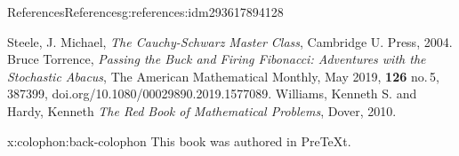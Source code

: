 \documentclass[twoside,10pt,]{book}
\newcommand{\xreffont}{\relax}
\numberwithin{equation}{section}
\begin{document}
\begin{references-chapter-numberless}{References}{}{References}{}{}{g:references:idm293617894128}
\begin{referencelist}
\label{x:biblio:biblio-steele-2004}{}\hypertarget{x:biblio:biblio-steele-2004}{}Steele, J. Michael, \textit{The Cauchy-Schwarz Master Class}, Cambridge U. Press, 2004.
\label{x:biblio:biblio-torrence}{}\hypertarget{x:biblio:biblio-torrence}{}Bruce Torrence, \textit{Passing the Buck and Firing Fibonacci: Adventures with the Stochastic Abacus}, The American Mathematical Monthly, May 2019, \textbf{126} no.\@\,5, 387\textendash{}399, doi.org\slash{}10.1080\slash{}00029890.2019.1577089.
\label{x:biblio:biblio-williams-2010}{}\hypertarget{x:biblio:biblio-williams-2010}{}Williams, Kenneth S. and  Hardy, Kenneth \textit{The Red Book of Mathematical Problems}, Dover, 2010.
\end{referencelist}
\end{references-chapter-numberless}
%
{\xreffont\printindex}
%
\cleardoublepage
\pagestyle{empty}
\begin{backcolophon}{x:colophon:back-colophon}%
This book was authored in PreTeXt.%
\end{backcolophon}%
\end{document}
